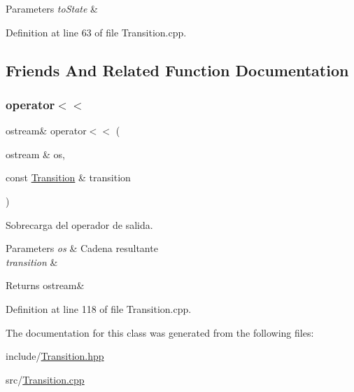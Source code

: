 \begin{DoxyParams}{Parameters}
{\em to\+State} & \\
\hline
\end{DoxyParams}


Definition at line 63 of file Transition.\+cpp.



\subsection{Friends And Related Function Documentation}
\mbox{\label{class_transition_ab1393a65ad3451f1fb24f8fbf1f4247f}} 
\subsubsection{\texorpdfstring{operator$<$$<$}{operator<<}}
{\footnotesize\ttfamily ostream\& operator$<$$<$ (\begin{DoxyParamCaption}\item[{ostream \&}]{os,  }\item[{const \hyperlink{class_transition}{Transition} \&}]{transition }\end{DoxyParamCaption})\hspace{0.3cm}{\ttfamily [friend]}}



Sobrecarga del operador de salida. 


\begin{DoxyParams}{Parameters}
{\em os} & Cadena resultante \\
\hline
{\em transition} & \\
\hline
\end{DoxyParams}
\begin{DoxyReturn}{Returns}
ostream\& 
\end{DoxyReturn}


Definition at line 118 of file Transition.\+cpp.



The documentation for this class was generated from the following files\+:\begin{DoxyCompactItemize}
\item 
include/\hyperlink{_transition_8hpp}{Transition.\+hpp}\item 
src/\hyperlink{_transition_8cpp}{Transition.\+cpp}\end{DoxyCompactItemize}
